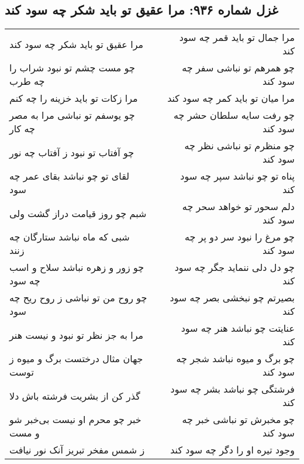 \begin{center}
\section*{غزل شماره ۹۳۶: مرا عقیق تو باید شکر چه سود کند}
\label{sec:0936}
\begin{longtable}{l p{0.5cm} r}
مرا عقیق تو باید شکر چه سود کند
&&
مرا جمال تو باید قمر چه سود کند
\\
چو مست چشم تو نبود شراب را چه طرب
&&
چو همرهم تو نباشی سفر چه سود کند
\\
مرا زکات تو باید خزینه را چه کنم
&&
مرا میان تو باید کمر چه سود کند
\\
چو یوسفم تو نباشی مرا به مصر چه کار
&&
چو رفت سایه سلطان حشر چه سود کند
\\
چو آفتاب تو نبود ز آفتاب چه نور
&&
چو منظرم تو نباشی نظر چه سود کند
\\
لقای تو چو نباشد بقای عمر چه سود
&&
پناه تو چو نباشد سپر چه سود کند
\\
شبم چو روز قیامت دراز گشت ولی
&&
دلم سحور تو خواهد سحر چه سود کند
\\
شبی که ماه نباشد ستارگان چه زنند
&&
چو مرغ را نبود سر دو پر چه سود کند
\\
چو زور و زهره نباشد سلاح و اسب چه سود
&&
چو دل دلی ننماید جگر چه سود کند
\\
چو روح من تو نباشی ز روح ریح چه سود
&&
بصیرتم چو نبخشی بصر چه سود کند
\\
مرا به جز نظر تو نبود و نیست هنر
&&
عنایتت چو نباشد هنر چه سود کند
\\
جهان مثال درختست برگ و میوه ز توست
&&
چو برگ و میوه نباشد شجر چه سود کند
\\
گذر کن از بشریت فرشته باش دلا
&&
فرشتگی چو نباشد بشر چه سود کند
\\
خبر چو محرم او نیست بی‌خبر شو و مست
&&
چو مخبرش تو نباشی خبر چه سود کند
\\
ز شمس مفخر تبریز آنک نور نیافت
&&
وجود تیره او را دگر چه سود کند
\\
\end{longtable}
\end{center}
